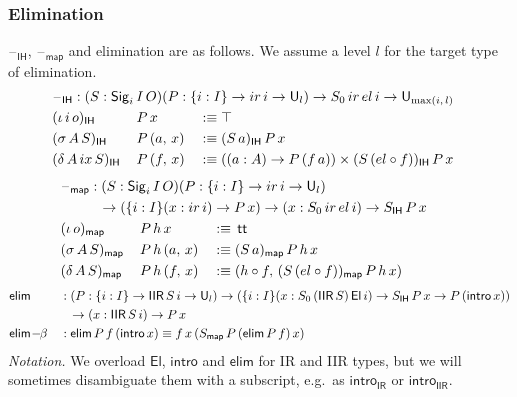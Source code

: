 \documentclass[acmsmall,screen,review,anonymous]{acmart}
\newcommand{\msf}[1]{{\mathsf{#1}}}
\newcommand{\U}{\msf{U}}
\newcommand{\El}{\msf{El}}
\newcommand{\Sig}{\msf{Sig}}
\newcommand{\ttt}{\msf{tt}}
\newcommand{\blank}{{\mathord{\hspace{1pt}\text{--}\hspace{1pt}}}}
\newcommand{\ir}{{ir}}
\newcommand{\el}{{el}}
\newcommand{\ix}{{ix}}
\newcommand{\IR}{\msf{IR}}
\newcommand{\intro}{\msf{intro}}
\newcommand{\IH}{\msf{IH}}
\newcommand{\map}{\msf{map}}
\newcommand{\elim}{\msf{elim}}
\newcommand{\IIR}{\msf{IIR}}
\begin{document}
\subsubsection{Elimination}\label{sec:iir-elimination} $\blank_\IH$, $\blank_\map$ and elimination are
as follows. We assume a level $l$ for the target type of elimination.
\begin{alignat*}{3}
  &\rlap{$\blank_\IH : (S : \Sig_i\,I\,O)(P : \{i : I\}\to \ir\,i \to \U_l) \to S_0\,\ir\,\el\,i \to \U_{\max(i,\,l)}$} \\
  &(\iota\,i\,o)_\IH \,&&P\,x       &&:\equiv \top \\
  &(\sigma\,A\,S)_\IH\,&&P\,(a,\,x) &&:\equiv (S\,a)_\IH\,P\,x \\
  &(\delta\,A\,\ix\,S)_\IH\,&&P\,(f,\,x) &&:\equiv ((a : A) \to P\,(f\,a)) \times (S\,(\el \circ f))_\IH\,P\,x
\end{alignat*}
\begin{alignat*}{3}
  &\hspace{-3em}\rlap{$\blank_\map : (S : \Sig_i\,I\,O)(P : \{i : I\}\to \ir\,i \to \U_l)$}\\
  &\hspace{-3em}\rlap{$\hspace{3em}\to (\{i : I\}(x : \ir\,i) \to P\,x) \to (x : S_0\,\ir\,\el\,i) \to S_\IH\,P\,x$} \\
  &\hspace{-3em}(\iota\,o)_\map    \,&&P\,h\,x       &&:\equiv\,\ttt \\
  &\hspace{-3em}(\sigma\,A\,S)_\map\,&&P\,h\,(a,\,x) &&:\equiv (S\,a)_\map\,P\,h\,x \\
  &\hspace{-3em}(\delta\,A\,S)_\map\,&&P\,h\,(f,\,x) &&:\equiv (h \circ f,\,(S\,(\el \circ f))_\map\,P\,h\,x)
\end{alignat*}
\begin{alignat*}{3}
  &\elim           &&: (P : \{i : I\}\to \IIR\,S\,i \to \U_l) \to (\{i : I\}(x : S_0\,(\IIR\,S)\,\El\,i) \to S_\IH\,P\,x \to P\,(\intro\,x))\\
  &                && \hspace{0.7em}\to (x : \IIR\,S\,i) \to P\,x \\
  &\elim\!-\!\!\beta &&: \elim\,P\,f\,(\intro\,x) \equiv f\,x\,(S_\map\,P\,(\elim\,P\,f)\,x)
\end{alignat*}
\emph{Notation.} We overload $\El$, $\intro$ and $\elim$ for IR and IIR types, but we will sometimes disambiguate them
with a subscript, e.g.\ as $\intro_\IR$ or $\intro_\IIR$.
\end{document}
